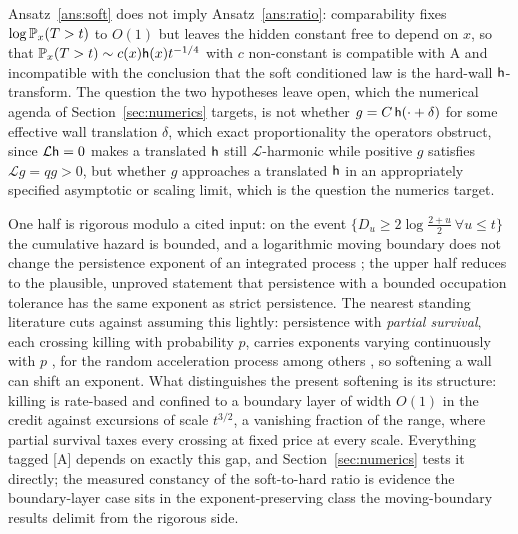 \noindent Ansatz~\ref{ans:soft} does not imply Ansatz~\ref{ans:ratio}:
comparability fixes $\log\mathbb{P}_x(T>t)$ to $O(1)$ but leaves the hidden
constant free to depend on $x$, so that $\mathbb{P}_x(T>t)\sim c(x)\mathsf{h}(x)t^{-1/4}$
with $c$ non-constant is compatible with A and incompatible with the
conclusion that the soft conditioned law is the hard-wall
$\mathsf{h}$-transform. The question the two hypotheses leave open, which
the numerical agenda of Section~\ref{sec:numerics} targets, is not whether $g = C\,\mathsf{h}(\cdot + \delta)$ for some effective wall translation $\delta$, which exact proportionality the operators obstruct, since $\mathcal{L}\mathsf{h} = 0$ makes a translated $\mathsf{h}$ still $\mathcal{L}$-harmonic while positive $g$ satisfies $\mathcal{L} g = q g > 0$, but whether $g$ approaches a translated $\mathsf{h}$ in an appropriately specified asymptotic or scaling limit, which is the question the numerics target.

One half is rigorous modulo a cited input: on the event
$\{D_u\ge2\log\frac{2+u}{2}\ \forall u\le t\}$ the cumulative hazard
is bounded, and a logarithmic moving boundary does not change the
persistence exponent of an integrated process \cite{AS15,DW15}; the
upper half reduces to the plausible, unproved statement that
persistence with a bounded occupation tolerance has the same exponent
as strict persistence. The nearest standing literature cuts against
assuming this lightly: persistence with \emph{partial survival}, each crossing killing with probability $p$, carries exponents
varying continuously with $p$ \cite{MB98}, for the random acceleration
process among others \cite{Bur14}, so softening a wall can shift an
exponent. What distinguishes the present softening is its structure:
killing is rate-based and confined to a boundary layer of width $O(1)$
in the credit against excursions of scale $t^{3/2}$, a vanishing
fraction of the range, where partial survival taxes every crossing
at fixed price at every scale. Everything tagged [A] depends on exactly
this gap, and Section~\ref{sec:numerics} tests it directly; the
measured constancy of the soft-to-hard ratio is evidence the
boundary-layer case sits in the exponent-preserving class the
moving-boundary results delimit from the rigorous side.

